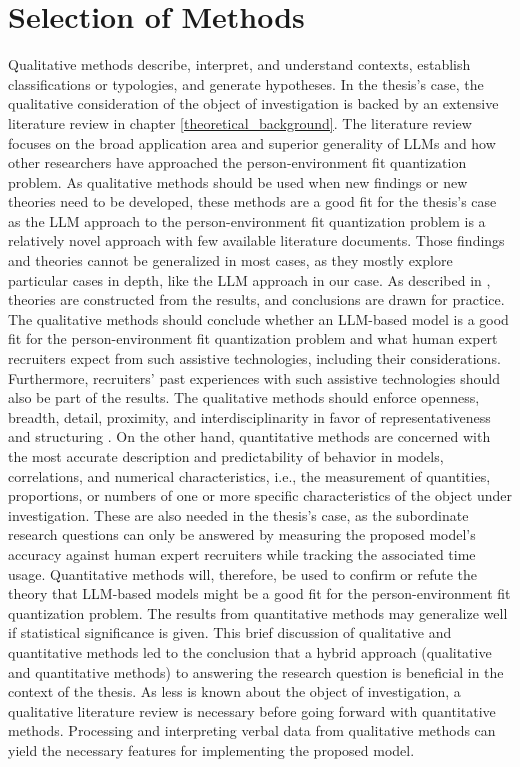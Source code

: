 \documentclass[draft,final]{thesisclass} %
\begin{document}
\section{Selection of Methods}
Qualitative methods describe, interpret, and understand contexts, establish classifications or typologies, and generate hypotheses.
In the thesis's case, the qualitative consideration of the object of investigation is backed by an extensive literature review in chapter \ref{theoretical_background}.
The literature review focuses on the broad application area and superior generality of \gls{LLM}s and how other researchers have approached the person-environment fit quantization problem.
As qualitative methods should be used when new findings or new theories need to be developed, these methods are a good fit for the thesis's case as the \gls{LLM} approach to the person-environment fit quantization problem is a relatively novel approach with few available literature documents.
Those findings and theories cannot be generalized in most cases, as they mostly explore particular cases in depth, like the \gls{LLM} approach in our case.
As described in \textcite[127]{qualitative_methods}, theories are constructed from the results, and conclusions are drawn for practice.
The qualitative methods should conclude whether an \gls{LLM}-based model is a good fit for the person-environment fit quantization problem and what human expert recruiters expect from such assistive technologies, including their considerations.
Furthermore, recruiters' past experiences with such assistive technologies should also be part of the results.
The qualitative methods should enforce openness, breadth, detail, proximity, and interdisciplinarity in favor of representativeness and structuring \parencite[127]{qualitative_methods}.
On the other hand, quantitative methods are concerned with the most accurate description and predictability of behavior in models, correlations, and numerical characteristics, i.e., the measurement of quantities, proportions, or numbers of one or more specific characteristics of the object under investigation.
These are also needed in the thesis's case, as the subordinate research questions can only be answered by measuring the proposed model's accuracy against human expert recruiters while tracking the associated time usage.
Quantitative methods will, therefore, be used to confirm or refute the theory that \gls{LLM}-based models might be a good fit for the person-environment fit quantization problem.
The results from quantitative methods may generalize well if statistical significance is given.
This brief discussion of qualitative and quantitative methods led to the conclusion that a hybrid approach (qualitative and quantitative methods) to answering the research question is beneficial in the context of the thesis.
As less is known about the object of investigation, a qualitative literature review is necessary before going forward with quantitative methods.
Processing and interpreting verbal data from qualitative methods can yield the necessary features for implementing the proposed model.
\end{document}
